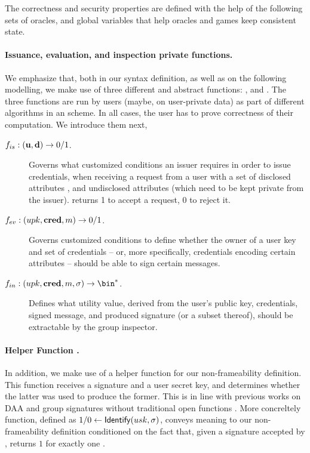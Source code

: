 The correctness and security properties are defined with the help of the
following sets of oracles, and global variables that help oracles and games
keep consistent state.

\paragraph{Issuance, evaluation, and inspection private functions.} %
We emphasize that, both in our syntax definition, as well as on the following
modelling, we make use of three different and abstract functions: \fissue,
\feval and \finsp. The three functions are run by users (maybe, on user-private
data) as part of different algorithms in an \UAS scheme. In all cases, the
user has to prove correctness of their computation. We introduce them next,

\begin{description}
\item[$f_{is}: (\mathbf{u},\mathbf{d}) \rightarrow 0/1$.] Governs what customized
  conditions an issuer requires in order to issue credentials, when receiving
  a request from a user with a set of disclosed attributes \dattrs, and
  undisclosed attributes \uattrs (which need to be kept private from the
  issuer). \fissue returns 1 to accept a request, 0 to reject it.  
\item[$f_{ev}: (upk,\mathbf{cred},m) \rightarrow 0/1$.] Governs customized
  conditions to define whether the owner of a user key and set of credentials --
  or, more specifically, credentials encoding certain attributes -- should be
  able to sign certain messages.
\item[$\finsp: (\upk,\scred,\msg,\sig) \rightarrow \bin^*$.] Defines what
  utility value, derived from the user's public key, credentials, signed
  message, and produced signature (or a subset thereof), should be extractable
  by the group inspector.
\end{description}


\paragraph{Helper Function \Identify.} In addition, we make use of a helper
function \Identify for our non-frameability definition. This function receives
a signature and a user secret key, and determines whether the latter was used
to produce the former. This is in line with previous works on DAA
\cite{bfg+11,cdl16} and group signatures without traditional open functions
\cite{dl21,fgl21,gl19}. More concreltely \Identify function, defined as $1/0
\gets \mathsf{Identify}(usk,\sigma)$, conveys meaning to our non-frameability definition
conditioned on the fact that, given a signature \sig accepted by \Verify,
\Identify returns $1$ for exactly one \usk.

